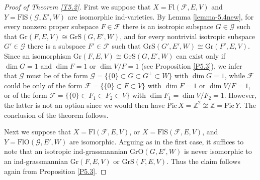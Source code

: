 \documentclass[12pt]{amsart}
\newcommand{\Flags}{\mathrm{Fl}}
\newcommand{\Grass}{\mathrm{Gr}}
\newcommand{\OFlags}{\mathrm{FlO}}
\newcommand{\OGrass}{\mathrm{GrO}}
\newcommand{\SFlags}{\mathrm{FlS}}
\newcommand{\SGrass}{\mathrm{GrS}}
\newcommand{\Pic}{\mathrm{Pic}}
\newtheorem{lemma}[theorem]{Lemma}
\theoremstyle{definition}
\newcommand{\GL}{\mathrm{GL}}
\begin{document}
\begin{proof}[Proof of Theorem \ref{T5.2}]
First we suppose that $X=\Flags(\mathcal{F},E,V)$ and $Y=\SFlags(\mathcal{G},E',W)$ are isomorphic ind-varieties. By Lemma \ref{lemma-5.4new}, for every nonzero proper subspace $F\in \mathcal{F}$ there is an isotropic subspace $G\in\mathcal{G}$ such that $\Grass(F,E,V)\cong\SGrass(G,E',W)$, and for every nontrivial isotropic subspace $G'\in\mathcal{G}$ there is a subspace $F'\in\mathcal{F}$ such that $\SGrass(G',E',W)\cong\Grass(F',E,V)$. Since an isomorphism $\Grass(F,E,V)\cong\SGrass(G,E',W)$
can exist only if $\dim G=1$ and $\dim F=1$ or $\dim V/F=1$ (see Proposition \ref{P5.3}),
we infer that $\mathcal{G}$ must be of the form $\mathcal{G}=\{\{0\}\subset G\subset G^\perp\subset W\}$ with $\dim G=1$, while $\mathcal{F}$ could be only  of the form $\mathcal{F}=\{\{0\}\subset F\subset V\}$ with $\dim F=1$ or $\dim V/F=1$, or of the form $\mathcal{F}=\{\{0\}\subset F_1\subset F_2\subset V\}$ with $\dim F_1=\dim V/F_2=1$. However, the latter is not an option since we would then have $\Pic\,X=\mathbb{Z}^2\not\cong\mathbb{Z}=\Pic\,Y$. The conclusion of the theorem follows.

Next we suppose that $X=\Flags(\mathcal{F},E,V)$, or $X=\SFlags(\mathcal{F},E,V)$, and $Y=\OFlags(\mathcal{G},E',W)$ are isomorphic. Arguing as in the first case, it  suffices to note that an isotropic ind-grassmannian $\OGrass(G,E',W)$ is never isomorphic to an ind-grassmannian $\Grass(F,E,V)$ or $\SGrass(F,E,V)$. Thus the claim follows again from Proposition \ref{P5.3}.
\end{proof}




\end{document}
